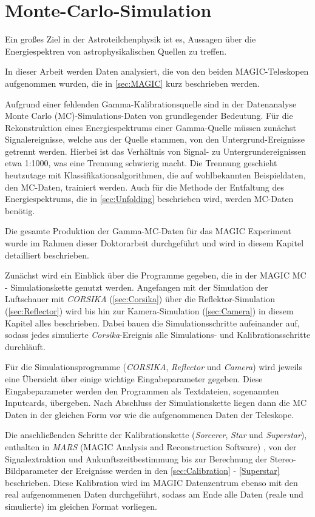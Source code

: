 \chapter{Monte-Carlo-Simulation}
Ein großes Ziel in der Astroteilchenphysik ist es, Aussagen über die Energiespektren von astrophysikalischen Quellen zu treffen.

In dieser Arbeit werden Daten analysiert, die von den beiden MAGIC-Teleskopen \cite{MAGIC_Telescopes} aufgenommen wurden, die in \autoref{sec:MAGIC} kurz beschrieben werden.

Aufgrund einer fehlenden Gamma-Kalibrationsquelle sind in der Datenanalyse Monte Carlo (MC)-Simulations-Daten von grundlegender Bedeutung.
Für die Rekonstruktion eines Energiespektrums einer Gamma-Quelle müssen zunächst Signalereignisse, welche aus der Quelle stammen, von den Untergrund-Ereignisse getrennt werden.
Hierbei ist das Verhältnis von Signal- zu Untergrundereignissen etwa 1:1000, was eine Trennung schwierig macht.
Die Trennung geschieht heutzutage mit Klassifikationsalgorithmen, die auf wohlbekannten Beispieldaten, den MC-Daten, trainiert werden.
Auch für die Methode der Entfaltung des Energiespektrums, die in \autoref{sec:Unfolding} beschrieben wird, werden MC-Daten benötig.

Die gesamte Produktion der Gamma-MC-Daten für das MAGIC Experiment wurde im Rahmen dieser Doktorarbeit durchgeführt und wird in diesem Kapitel detailliert beschrieben.

Zunächst wird ein Einblick über die Programme gegeben, die in der MAGIC MC - Simulationskette genutzt werden.
Angefangen mit der Simulation der Luftschauer mit \textit{CORSIKA} \cite{CORSIKA} (\autoref{sec:Corsika}) über die Reflektor-Simulation \cite{Reflector} (\autoref{sec:Reflector}) wird bis hin zur Kamera-Simulation \cite{Camera} (\autoref{sec:Camera}) in diesem Kapitel alles beschrieben.
Dabei bauen die Simulationsschritte aufeinander auf, sodass jedes simulierte \textit{Corsika}-Ereignis alle Simulations- und Kalibrationsschritte durchläuft.

Für die Simulationsprogramme (\textit{CORSIKA}, \textit{Reflector} und \textit{Camera}) wird jeweils eine Übersicht über einige wichtige Eingabeparameter gegeben.
Diese Eingabeparameter werden den Programmen als Textdateien, sogenannten Inputcards, übergeben.
Nach Abschluss der Simulationskette liegen dann die MC Daten in der gleichen Form vor wie die aufgenommenen Daten der Teleskope. 

Die anschließenden Schritte der Kalibrationskette (\textit{Sorcerer}, \textit{Star} und \textit{Superstar}), enthalten in \textit{MARS} (MAGIC Analysis and Reconstruction Software) \cite{MARS}, von der Signalextraktion und Ankunftszeitbestimmung bis zur Berechnung der Stereo-Bildparameter der Ereignisse werden in den \autoref{sec:Calibration} - \autoref{Superstar} beschrieben.
Diese Kalibration wird im MAGIC Datenzentrum ebenso mit den real aufgenommenen Daten durchgeführt, sodass am Ende alle Daten (reale und simulierte) im gleichen Format vorliegen.

